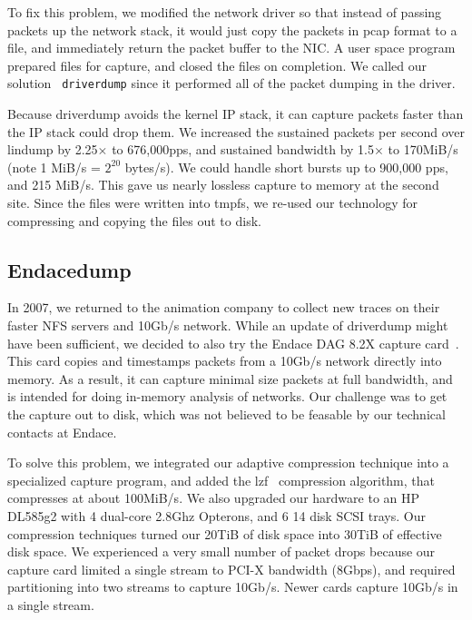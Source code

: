 To fix this problem, we modified the network driver so that instead of
passing packets up the network stack, it would just copy the packets
in pcap format to a file, and immediately return the packet
buffer to the NIC.  A user space program prepared files for capture,
and closed the files on completion.  We called our solution {\tt
driverdump} since it performed all of the packet dumping in the
driver.

Because driverdump avoids the kernel IP stack, it can
capture packets faster than the IP stack could drop them.
We increased the sustained packets per second over lindump by 2.25$\times$ to
676,000pps, and sustained bandwidth by 1.5$\times$ to 170MiB/s (note 1 MiB/s = $2^20$ bytes/s).  We could
handle short bursts up to 900,000 pps, and 215 MiB/s.  This gave us
nearly lossless capture to memory at the second site.  Since the files
were written into tmpfs, we re-used our technology for compressing and
copying the files out to disk.

\subsection{Endacedump}

In 2007, we returned to the animation company to collect new traces on
their faster NFS servers and 10Gb/s network.  While an update of
driverdump might have been sufficient, we decided to also try the
Endace DAG 8.2X capture card~\cite{endace-cards}.  This card copies
and timestamps packets from a 10Gb/s network directly into memory.  As
a result, it can capture minimal size packets at full bandwidth, and
is intended for doing in-memory analysis of networks.  Our challenge
was to get the capture out to disk, which was not believed to be
feasable by our technical contacts at Endace.

To solve this problem, we integrated our adaptive compression
technique into a specialized capture program, and added the
lzf~\cite{lzf} compression algorithm, that compresses at about
100MiB/s.  We also upgraded our hardware to an HP DL585g2 with 4 
dual-core 2.8Ghz Opterons, and 6 14 disk SCSI trays.  Our compression
techniques turned our 20TiB of disk space into 30TiB of effective disk
space.  We experienced a very small number of packet drops because our
capture card limited a single stream to PCI-X bandwidth (8Gbps), and
required partitioning into two streams to capture 10Gb/s.  Newer cards
capture 10Gb/s in a single stream.

